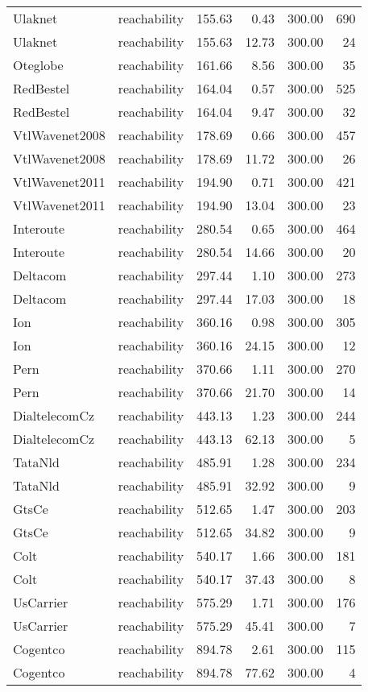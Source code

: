 \begin{tabular}{llrrrr}
Ulaknet & reachability & 155.63 & 0.43 & 300.00 & 690 \\
Ulaknet & reachability & 155.63 & 12.73 & 300.00 & 24 \\
Oteglobe & reachability & 161.66 & 8.56 & 300.00 & 35 \\
RedBestel & reachability & 164.04 & 0.57 & 300.00 & 525 \\
RedBestel & reachability & 164.04 & 9.47 & 300.00 & 32 \\
VtlWavenet2008 & reachability & 178.69 & 0.66 & 300.00 & 457 \\
VtlWavenet2008 & reachability & 178.69 & 11.72 & 300.00 & 26 \\
VtlWavenet2011 & reachability & 194.90 & 0.71 & 300.00 & 421 \\
VtlWavenet2011 & reachability & 194.90 & 13.04 & 300.00 & 23 \\
Interoute & reachability & 280.54 & 0.65 & 300.00 & 464 \\
Interoute & reachability & 280.54 & 14.66 & 300.00 & 20 \\
Deltacom & reachability & 297.44 & 1.10 & 300.00 & 273 \\
Deltacom & reachability & 297.44 & 17.03 & 300.00 & 18 \\
Ion & reachability & 360.16 & 0.98 & 300.00 & 305 \\
Ion & reachability & 360.16 & 24.15 & 300.00 & 12 \\
Pern & reachability & 370.66 & 1.11 & 300.00 & 270 \\
Pern & reachability & 370.66 & 21.70 & 300.00 & 14 \\
DialtelecomCz & reachability & 443.13 & 1.23 & 300.00 & 244 \\
DialtelecomCz & reachability & 443.13 & 62.13 & 300.00 & 5 \\
TataNld & reachability & 485.91 & 1.28 & 300.00 & 234 \\
TataNld & reachability & 485.91 & 32.92 & 300.00 & 9 \\
GtsCe & reachability & 512.65 & 1.47 & 300.00 & 203 \\
GtsCe & reachability & 512.65 & 34.82 & 300.00 & 9 \\
Colt & reachability & 540.17 & 1.66 & 300.00 & 181 \\
Colt & reachability & 540.17 & 37.43 & 300.00 & 8 \\
UsCarrier & reachability & 575.29 & 1.71 & 300.00 & 176 \\
UsCarrier & reachability & 575.29 & 45.41 & 300.00 & 7 \\
Cogentco & reachability & 894.78 & 2.61 & 300.00 & 115 \\
Cogentco & reachability & 894.78 & 77.62 & 300.00 & 4 \\
\bottomrule
\end{tabular}
